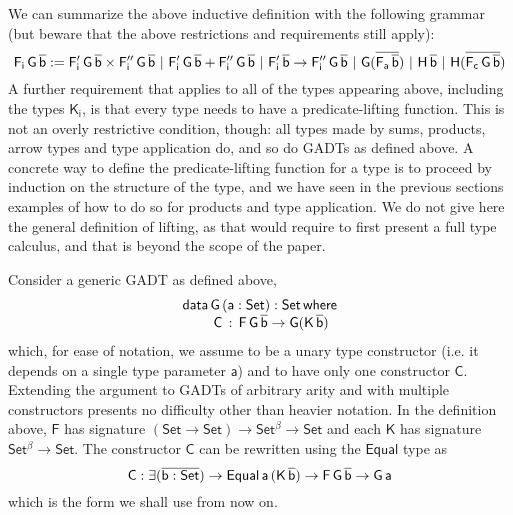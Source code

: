 \documentclass[acmsmall,screen,review,anonymous]{acmart}
\theoremstyle{definition}
\begin{document}
We can summarize the above inductive definition with the following grammar
(but beware that the above restrictions and requirements still apply):
\[
\mathsf{F_i\,G\,\overline{b} :=
F_i'\,G\,\overline{b} \times F_i''\,G\,\overline{b}
\ \vert\ F_i'\,G\,\overline{b} + F_i''\,G\,\overline{b}
\ \vert\ F_i'\,\overline{b} \to F_i''\,G\,\overline{b}
\ \vert\ G(\overline{F_a\,\overline{b}})
\ \vert\ H\,\overline{b}
\ \vert\ H (\overline{F_c\,G\,\overline{b}})
}
\]
A further requirement that applies to all of the types appearing above,
including the types $\mathsf{K_i}$,
is that every type needs to have a predicate-lifting function.
This is not an overly restrictive condition, though:
all types made by sums, products, arrow types and type application do, and so do GADTs as defined above.
A concrete way to define the predicate-lifting function for a type is to proceed by induction on the structure of the type,
and we have seen in the previous sections examples of how to do so for products and type application.
We do not give here the general definition of lifting,
as that would require to first present a full type calculus,
and that is beyond the scope of the paper.


Consider a generic GADT as defined above,
\begin{equation}\label{eq:gadt}
\begin{array}{l}
\mathsf{data\, G\,(a : Set) : Set\,where}\\
\mathsf{\;\;\;\;\;\;\;\;C\, :\, F\,G\,\overline{b} \to G (K\,\overline{b})}
\end{array}
\end{equation}
which, for ease of notation,
we assume to be a unary type constructor (i.e. it depends on a single type parameter $\mathsf{a}$)
and to have only one constructor $\mathsf{C}$.
Extending the argument to GADTs of arbitrary arity and with multiple constructors presents no difficulty
other than heavier notation.
In the definition above, $\mathsf{F}$ has signature $\mathsf{(Set \to Set) \to Set^{\beta} \to Set}$
and each $\mathsf{K}$ has signature $\mathsf{Set^{\beta} \to Set}$.
The constructor $\mathsf{C}$ can be rewritten using the $\mathsf{Equal}$ type as
\[
\mathsf{C : \exists (\overline{b : Set}) \to Equal\,a\,(K\,\overline{b}) \to F\,G\,\overline{b} \to G\,a}
\]
which is the form we shall use from now on.
\end{document}
